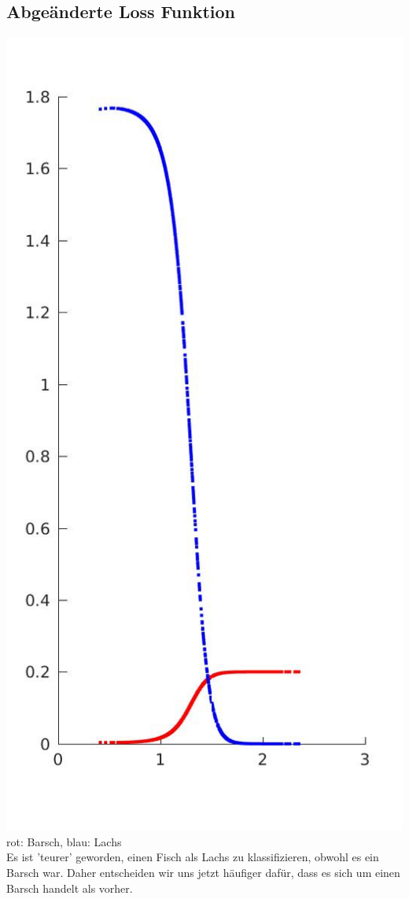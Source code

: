 \documentclass{scrartcl}
\begin{document}
\subsection{Abgeänderte Loss Funktion}
\includegraphics[width=.6\textwidth]{plots/3d_conditional_risk.jpg}\\
rot: Barsch, blau: Lachs\\

Es ist 'teurer' geworden, einen Fisch als Lachs zu klassifizieren, obwohl es ein Barsch war. Daher entscheiden wir uns jetzt häufiger dafür, dass es sich um einen Barsch handelt als vorher.
\end{document}
